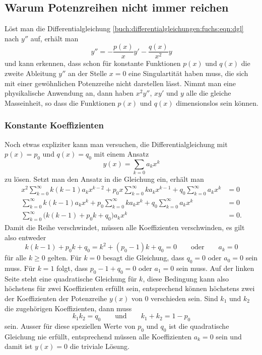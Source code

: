 %
%
%
\subsection{Warum Potenzreihen nicht immer reichen
\label{buch:differentialgleichungen:fuchs:subsection:warum}}
Löst man die Differentialgleichung
\eqref{buch:differentialgleichungen:fuchs:eqn:dgl}
nach $y''$ auf, erhält man
\[
y''
=
-
\frac{p(x)}{x}y'
-
\frac{q(x)}{x^2}y
\]
und kann erkennen, dass schon für konstante Funktionen $p(x)$ und
$q(x)$ die zweite Ableitung $y''$ an der Stelle $x=0$ eine
Singulartität haben muss, die sich mit einer gewöhnlichen
Potenzreihe nicht darstellen lässt.
Nimmt man eine physikalische Anwendung an, dann haben
$x^2y''$, $xy'$ und $y$ alle die gleiche Masseinheit, so dass
die Funktionen $p(x)$ und $q(x)$ dimensionslos sein können.

%
%
\subsubsection{Konstante Koeffizienten
\label{buch:differentialgleichungen:fuchs:subsection:konstant}}
Noch etwas expliziter kann man versuchen, die Differentialgleichung
mit $p(x)=p_0$ und $q(x)=q_0$ mit einem Ansatz
\[
y(x) = \sum_{k=0}a_kx^k
\]
zu lösen.
Setzt man den Ansatz in die Gleichung ein, erhält man
\begin{align*}
x^2
\sum_{k=0}^\infty k(k-1) a_k x^{k-2}
+
p_0x\sum_{k=0}^\infty ka_k x^{k-1}
+
q_0\sum_{k=0}^\infty a_kx^k
&=
0
\\
\sum_{k=0}^\infty k(k-1) a_k x^k
+
p_0\sum_{k=0}^\infty ka_k x^k
+
q_0\sum_{k=0}^\infty a_kx^k
&=
0
\\
\sum_{k=0}^\infty
\bigl(
k(k-1) + p_0k + q_0
\bigr)
a_k
x^k
&=
0.
\end{align*}
Damit die Reihe verschwindet, müssen alle Koeffizienten verschwinden,
es gilt also entweder 
\[
k(k-1)+p_0k+q_0
=
k^2+(p_0-1)k+q_0
=
0
\qquad\text{oder}\qquad
a_k=0
\]
für alle $k\ge 0$ gelten.
Für $k=0$ besagt die Gleichung, dass $q_0=0$ oder $a_0=0$ sein
muss.
Für $k=1$ folgt, dass $p_0-1+q_0=0$ oder $a_1=0$ sein muss.
Auf der linken Seite steht eine quadratische Gleichung für $k$, diese 
Bedingung kann also höchstens für zwei Koeffizienten erfüllt sein,
entsprechend können höchstens zwei der Koeffizienten der Potenzreihe
$y(x)$ von $0$ verschieden sein.
Sind $k_1$ und $k_2$ die zugehörigen Koeffizienten, dann muss
\[
k_1k_2 = q_0
\qquad\text{und}\qquad
k_1+k_2
=
1-p_0
\]
sein.
Ausser für diese speziellen Werte von $p_0$ und $q_0$ ist
die quadratische Gleichung nie erfüllt, entsprechend müssen
alle Koeffizienten $a_k=0$ sein und damit ist $y(x)=0$
die triviale Lösung.

